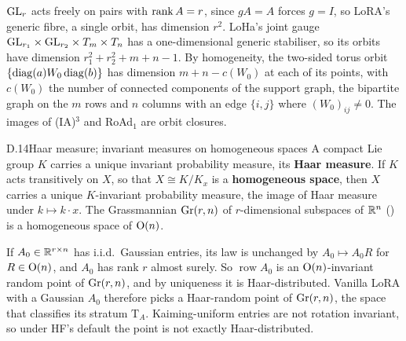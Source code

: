$\mathrm{GL}_r$ acts freely on pairs with $\operatorname{rank} A=r$, since $gA=A$ forces $g=I$, so LoRA's generic fibre, a single orbit, has
dimension $r^2$. LoHa's joint gauge $\mathrm{GL}_{r_1}\times\mathrm{GL}_{r_2}\times T_m\times T_n$ has a one-dimensional generic
stabiliser, so its orbits have dimension $r_1^2+r_2^2+m+n-1$. By homogeneity, the two-sided torus orbit
$\{\operatorname{diag}(a)W_0\operatorname{diag}(b)\}$ has dimension $m+n-c(W_0)$ at each of its points, with $c(W_0)$ the number of connected
components of the support graph, the bipartite graph on the $m$ rows and $n$ columns with an edge $\{i,j\}$ where
$(W_0)_{ij}\ne0$. The images of (IA)$^3$ and RoAd$_1$ are orbit closures.


\begin{bgentry}{D.14}{Haar measure; invariant measures on homogeneous spaces}
A compact Lie group $K$ carries a unique invariant probability measure, its \textbf{Haar measure}. If $K$ acts
transitively on $X$, so that $X\cong K/K_x$ is a \textbf{homogeneous space}, then $X$ carries a unique $K$-invariant
probability measure, the image of Haar measure under $k\mapsto k\cdot x$. The Grassmannian $\operatorname{Gr}(r,n)$ of $r$-dimensional
subspaces of $\mathbb{R}^n$ () is a homogeneous space of $\mathrm{O}(n)$.
\end{bgentry}

If $A_0\in\mathbb{R}^{r\times n}$ has i.i.d.\ Gaussian entries, its law is unchanged by $A_0\mapsto A_0R$ for $R\in\mathrm{O}(n)$, and
$A_0$ has rank $r$ almost surely. So $\operatorname{row}A_0$ is an $\mathrm{O}(n)$-invariant random point of $\operatorname{Gr}(r,n)$, and
by uniqueness it is Haar-distributed. Vanilla LoRA with a Gaussian $A_0$ therefore picks a Haar-random point of
$\operatorname{Gr}(r,n)$, the space that classifies its stratum $\mathrm T_A$. Kaiming-uniform entries are not rotation invariant, so
under HF's default the point is not exactly Haar-distributed.


